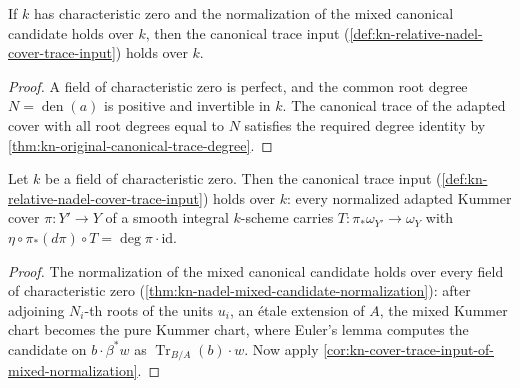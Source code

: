 \begin{corollary}
\label{cor:kn-cover-trace-input-of-mixed-normalization}
\leanok
If $k$ has characteristic zero and the normalization of the mixed canonical
candidate holds over $k$, then the canonical trace input
(\cref{def:kn-relative-nadel-cover-trace-input}) holds over $k$.
\end{corollary}
\begin{proof}
A field of characteristic zero is perfect, and the common root degree
$N=\operatorname{den}(a)$ is positive and invertible in $k$. The canonical trace
of the adapted cover with all root degrees equal to $N$ satisfies the required
degree identity by \cref{thm:kn-original-canonical-trace-degree}.
\end{proof}

\begin{theorem}
\label{thm:kn-cover-canonical-trace-input}
\leanok
Let $k$ be a field of characteristic zero. Then the canonical trace input
(\cref{def:kn-relative-nadel-cover-trace-input}) holds over $k$: every
normalized adapted Kummer cover $\pi:Y'\to Y$ of a smooth integral $k$-scheme
carries $T:\pi_*\omega_{Y'}\to\omega_Y$ with
$\eta\circ\pi_*(d\pi)\circ T=\deg\pi\cdot\mathrm{id}$.
\end{theorem}
\begin{proof}
The normalization of the mixed canonical candidate holds over every field of
characteristic zero (\cref{thm:kn-nadel-mixed-candidate-normalization}): after
adjoining $N_i$-th roots of the units $u_i$, an \'etale extension of $A$, the
mixed Kummer chart becomes the pure Kummer chart, where Euler's lemma computes the
candidate on $b\cdot\beta^*w$ as $\operatorname{Tr}_{B/A}(b)\cdot w$. Now apply
\cref{cor:kn-cover-trace-input-of-mixed-normalization}.
\end{proof}
